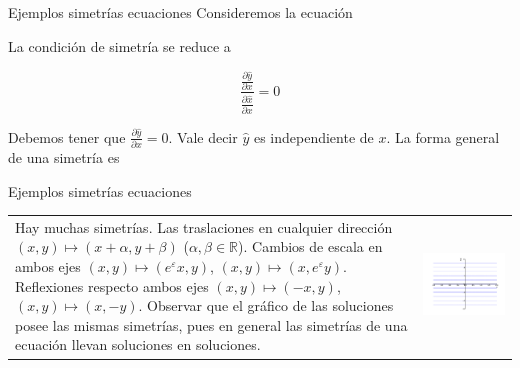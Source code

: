 \documentclass[handout,hyperref={colorlinks=true}]{beamer}
\newcommand{\rr}{\mathbb{R}}
\renewcommand{\emph}[1]{\textcolor[rgb]{1,0,0}{#1}}
\renewcommand{\epsilon}{\varepsilon}
\newcommand{\nl}{\onslide<+-> }
\begin{document}
\begin{frame}{Ejemplos simetrías ecuaciones }
Consideremos la ecuación

La condición de simetría se reduce a 

\[
\frac{\frac{\partial\hat{y}}{\partial x}}{\frac{\partial\hat{x}}{\partial x}}=0
\]

Debemos tener que $\frac{\partial\hat{y}}{\partial x}=0$. Vale decir $\hat{y}$ es independiente de $x$. La forma general de una simetría es

\end{frame}



\begin{frame}{Ejemplos simetrías ecuaciones }


\nl \begin{tabular}{m{5cm}m{5cm}}
\nl Hay muchas simetrías. Las traslaciones en cualquier dirección $(x,y)\mapsto (x+\alpha ,y+\beta)$ ($\alpha,\beta\in\rr$). Cambios de escala en ambos ejes  $(x,y)\mapsto (e^{\epsilon}x,y)$, $(x,y)\mapsto (x,e^{\epsilon}y)$. Reflexiones respecto ambos ejes  $(x,y)\mapsto (-x,y)$, $(x,y)\mapsto (x,-y)$. \nl Observar que el gráfico de las soluciones posee las mismas simetrías, pues en general \emph{las simetrías de una ecuación llevan soluciones en soluciones}.
& 
\includegraphics[scale=.3]{imagenes/sol_trivial.png}\\
\end{tabular}
\end{frame}
\end{document}
